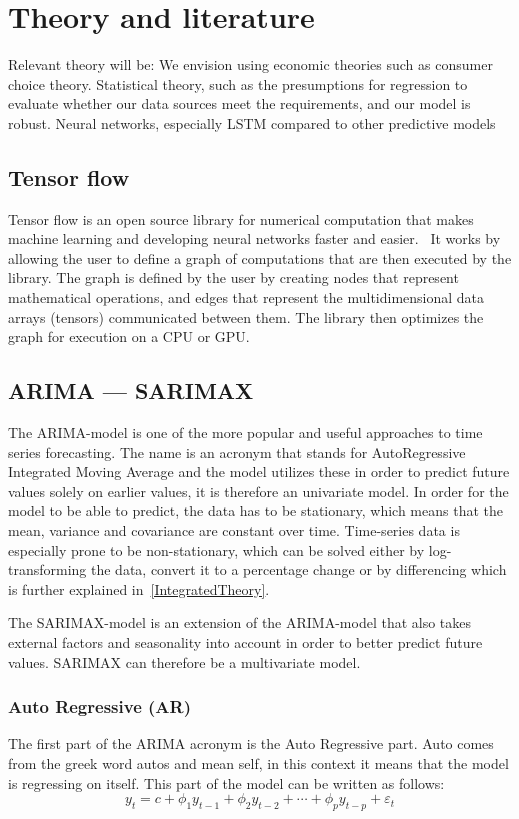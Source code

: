 \section{Theory and literature}

Relevant theory will be: 
We envision using economic theories such as consumer choice theory. 
Statistical theory, such as the presumptions for regression to evaluate whether our data sources meet the requirements, and our model is robust. 
Neural networks, especially LSTM compared to other predictive models 

\subsection{Tensor flow}
Tensor flow is an open source library for numerical computation that makes machine learning and developing neural networks faster and easier.~\parencite{yegulalp_2018}
It works by allowing the user to define a graph of computations that are then executed by the library. The graph is defined by the user by creating nodes that represent mathematical operations, and edges that represent the multidimensional data arrays (tensors) communicated between them. 
The library then optimizes the graph for execution on a CPU or GPU. 

\subsection{ARIMA --- SARIMAX}\label{ARIMATheory}

The ARIMA-model is one of the more popular and useful approaches to time series forecasting. The name is an acronym that stands for AutoRegressive Integrated Moving Average and the model utilizes these in order to predict future values solely on earlier values, it is therefore an univariate model. In order for the model to be able to predict, the data has to be stationary, which means that the mean, variance and covariance are constant over time. Time-series data is especially prone to be non-stationary, which can be solved either by log-transforming the data, convert it to a percentage change or by differencing which is further explained in~\ref{IntegratedTheory}.

The SARIMAX-model is an extension of the ARIMA-model that also takes external factors and seasonality into account in order to better predict future values. SARIMAX can therefore be a multivariate model. \parencite{hyndman_athanasopoulos_2021}

\subsubsection{Auto Regressive (AR)}\label{AutoRegressiveTheory}
The first part of the ARIMA acronym is the Auto Regressive part. Auto comes from the greek word autos and mean self, in this context it means that the model is regressing on itself. This part of the model can be written as follows:
\begin{equation}
y_{t} = c + \phi_{1}y_{t-1} + \phi_{2}y_{t-2} + \cdots + \phi_{p}y_{t-p} + \varepsilon_{t}
\end{equation}

